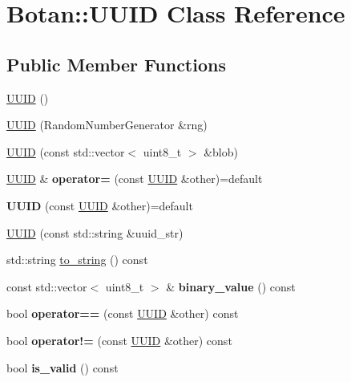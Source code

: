 \hypertarget{class_botan_1_1_u_u_i_d}{}\section{Botan\+:\+:U\+U\+ID Class Reference}
\label{class_botan_1_1_u_u_i_d}
\subsection*{Public Member Functions}
\begin{DoxyCompactItemize}
\item 
\hyperlink{class_botan_1_1_u_u_i_d_a1e8e37568ead09e587ca96cebcbab9d2}{U\+U\+ID} ()
\item 
\hyperlink{class_botan_1_1_u_u_i_d_a97713e2316b1c612813bb03c66dcbbb6}{U\+U\+ID} (Random\+Number\+Generator \&rng)
\item 
\hyperlink{class_botan_1_1_u_u_i_d_af2a8c7fb0ea61e9bb8c3a58a71c28724}{U\+U\+ID} (const std\+::vector$<$ uint8\+\_\+t $>$ \&blob)
\item 
\mbox{\label{class_botan_1_1_u_u_i_d_aceb7c9bab4eb8a98b74d4ed2a8eb1f06}} 
\hyperlink{class_botan_1_1_u_u_i_d}{U\+U\+ID} \& {\bfseries operator=} (const \hyperlink{class_botan_1_1_u_u_i_d}{U\+U\+ID} \&other)=default
\item 
\mbox{\label{class_botan_1_1_u_u_i_d_a725aa36f808e73e45b4bec3c91a041a1}} 
{\bfseries U\+U\+ID} (const \hyperlink{class_botan_1_1_u_u_i_d}{U\+U\+ID} \&other)=default
\item 
\hyperlink{class_botan_1_1_u_u_i_d_a621acc4dc66a8a330048588b23f61ae3}{U\+U\+ID} (const std\+::string \&uuid\+\_\+str)
\item 
std\+::string \hyperlink{class_botan_1_1_u_u_i_d_a707abb917ddb4996dbe987015cfac23c}{to\+\_\+string} () const
\item 
\mbox{\label{class_botan_1_1_u_u_i_d_a023d13c5e0872b58fd0d05fe484b0d0a}} 
const std\+::vector$<$ uint8\+\_\+t $>$ \& {\bfseries binary\+\_\+value} () const
\item 
\mbox{\label{class_botan_1_1_u_u_i_d_a9c35447e4068df7b8e7c2cc60a09714d}} 
bool {\bfseries operator==} (const \hyperlink{class_botan_1_1_u_u_i_d}{U\+U\+ID} \&other) const
\item 
\mbox{\label{class_botan_1_1_u_u_i_d_a1989fbea9467d241c1f6374eb5d52042}} 
bool {\bfseries operator!=} (const \hyperlink{class_botan_1_1_u_u_i_d}{U\+U\+ID} \&other) const
\item 
\mbox{\label{class_botan_1_1_u_u_i_d_a3abdc23efc8636d2add2fb47eac0bfa2}} 
bool {\bfseries is\+\_\+valid} () const
\end{DoxyCompactItemize}


